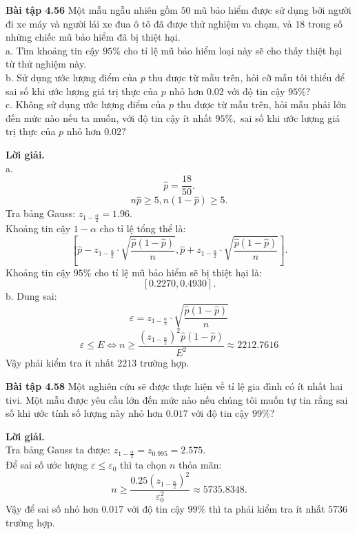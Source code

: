 \documentclass[12pt,a4paper]{article}
\begin{document}
\begin{mybox}
\textbf{Bài tập 4.56} Một mẫu ngẫu nhiên gồm $50$ mũ bảo hiểm được sử dụng bởi người đi xe máy và người lái xe đua ô tô đã được thử nghiệm va chạm, và $18$ trong số những chiếc mũ bảo hiểm đã bị thiệt hại.\\
a. Tìm khoảng tin cậy $95\%$ cho tỉ lệ mũ bảo hiểm loại này sẽ cho thấy thiệt hại từ thử nghiệm này.\\
b. Sử dụng ước lượng điểm của $p$ thu được từ mẫu trên, hỏi cỡ mẫu tối thiểu để sai số khi ước lượng giá trị thực của $p$ nhỏ hơn $0.02$ với độ tin cậy $95\%?$\\
c. Không sử dụng ước lượng điểm của $p$ thu được từ mẫu trên, hỏi mẫu phải lớn đến mức nào nếu ta muốn, với độ tin cậy ít nhất $95\%,$ sai số khi ước lượng giá trị thực của $p$ nhỏ hơn $0.02?$ 
\end{mybox}
\textbf{Lời giải.}\\
a. $$ \widehat{p} = \frac{18}{50}.$$
$$n\widehat{p} \geqslant 5, n \left( {1 - \widehat{p}} \right) \geqslant 5.$$
Tra bảng Gauss: $z_{1 - \frac{\alpha}{2}} = 1.96.$\\
Khoảng tin cậy $1 - \alpha$ cho tỉ lệ tổng thể là:
$$\left[ {\widehat{p} - z_{1 - \frac{\alpha}{2}} \cdot \sqrt{\frac{\widehat{p} \left( {1 - \widehat{p}} \right)}{n}}, \widehat{p} + z_{1 - \frac{\alpha}{2}} \cdot \sqrt{\frac{\widehat{p} \left( {1 - \widehat{p}} \right)}{n}}} \right].$$
Khoảng tin cậy $95\%$ cho tỉ lệ mũ bảo hiểm sẽ bị thiệt hại là:
$$\left[ {0.2270, 0.4930} \right].$$
b. Dung sai:
$$\varepsilon = z_{1 - \frac{\alpha}{2}} \cdot \sqrt{\frac{\widehat{p} \left( {1 - \widehat{p}} \right)}{n}}$$
$$\varepsilon \leqslant E \Leftrightarrow n \geqslant \frac{{{{\left( {{z_{1 - \frac{\alpha }{2}}}} \right)}^2}\widehat p\left( {1 - \widehat p} \right)}}{{{E^2}}} \approx 2212.7616$$
Vậy phải kiểm tra ít nhất $2213$ trường hợp.

\begin{mybox}
\textbf{Bài tập 4.58} Một nghiên cứu sẽ được thực hiện về tỉ lệ gia đình có ít nhất hai tivi. Một mẫu được yêu cầu lớn đến mức nào nếu chúng tôi muốn tự tin rằng sai số khi ước tính số lượng này nhỏ hơn $0.017$ với độ tin cậy $99\%?$
\end{mybox}
\textbf{Lời giải.}\\ 
Tra bảng Gauss ta được: $z_{1 - \frac{\alpha}{2}} = z_{0.995} = 2.575.$\\
Để sai số ước lượng $\varepsilon \leqslant \varepsilon_0$ thì ta chọn $n$ thỏa mãn:
$$n \geqslant \frac{{0.25{{\left( {{z_{1 - \frac{\alpha }{2}}}} \right)}^2}}}{{\varepsilon _0^2}} \approx 5735.8348.$$
Vậy để sai số nhỏ hơn $0.017$ với độ tin cậy $99\%$ thì ta phải kiểm tra ít nhất $5736$ trường hợp.
\end{document}
